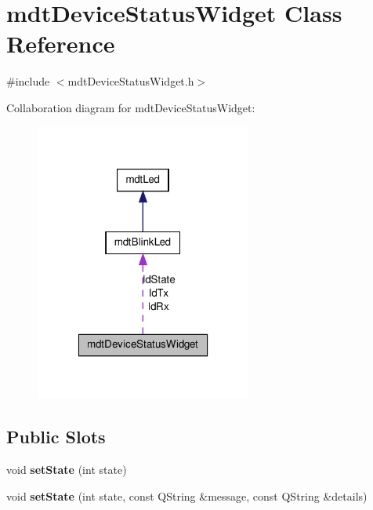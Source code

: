 \hypertarget{classmdt_device_status_widget}{
\section{mdtDeviceStatusWidget Class Reference}
\label{classmdt_device_status_widget}
}


{\ttfamily \#include $<$mdtDeviceStatusWidget.h$>$}



Collaboration diagram for mdtDeviceStatusWidget:\nopagebreak
\begin{figure}[H]
\begin{center}
\leavevmode
\includegraphics[width=202pt]{classmdt_device_status_widget__coll__graph}
\end{center}
\end{figure}
\subsection*{Public Slots}
\begin{DoxyCompactItemize}
\item 
\hypertarget{classmdt_device_status_widget_aff26f53555fcaf57d79d70c712e24928}{
void {\bfseries setState} (int state)}
\label{classmdt_device_status_widget_aff26f53555fcaf57d79d70c712e24928}

\item 
\hypertarget{classmdt_device_status_widget_af9d0bf5fb74e55bcdab7c8bd86ddfa33}{
void {\bfseries setState} (int state, const QString \&message, const QString \&details)}
\label{classmdt_device_status_widget_af9d0bf5fb74e55bcdab7c8bd86ddfa33}

\end{DoxyCompactItemize}
